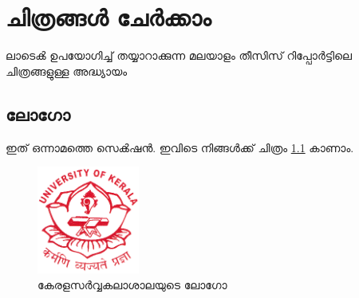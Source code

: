  
\chapter{ചിത്രങ്ങൾ ചേർക്കാം}
ലാടെൿ ഉപയോഗിച്ച് തയ്യാറാക്കുന്ന മലയാളം തീസിസ് റിപ്പോർട്ടിലെ ചിത്രങ്ങളുള്ള അദ്ധ്യായം

\section{ലോഗോ}

ഇത് ഒന്നാമത്തെ സെൿഷൻ. ഇവിടെ നിങ്ങൾക്ക് ചിത്രം \ref{logo} കാണാം.

\begin{figure}
\center
\includegraphics[width=0.3\textwidth]{./contents/logo.png}
\caption{കേരളസർവ്വകലാശാലയുടെ ലോഗോ}
\label{logo}
\end{figure}

